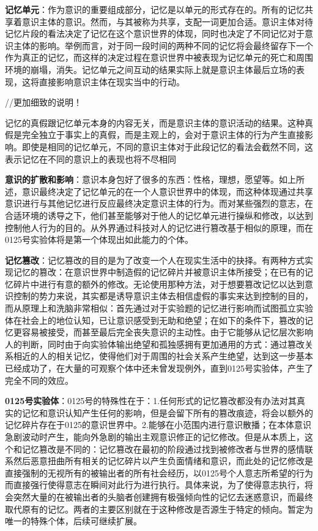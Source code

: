 \documentclass[12pt, a4paper]{article}
\begin{document}
        \medskip
        \textbf{记忆单元}：作为意识的重要组成部分，记忆是以单元的形式存在的。所有的记忆共享着意识主体的意识。然而，与其被称为共享，支配一词更加合适。意识主体对待记忆片段的看法决定了记忆在这个意识世界的体现，同时也决定了不同记忆对于意识主体的影响。举例而言，对于同一段时间的两种不同的记忆将会最终留存下一个作为真正的记忆，而这样的决定过程在意识世界中被表现为记忆单元的死亡和周围环境的崩塌，消失。记忆单元之间互动的结果实际上就是意识主体最后立场的表现，这将直接影响意识主体在现实当中的行动。 

        //更加细致的说明！

        记忆的真假跟记忆单元本身的内容无关，而是意识主体的意识活动的结果。这种真假是完全独立于事实上的真假，而是主观上的，会对于意识主体的行为产生直接影响。即使是相同的记忆单元，不同的意识主体对于此段记忆的看法会截然不同，这表示记忆在不同的意识上的表现也将不尽相同

        \medskip
        \textbf{意识的扩散和影响}：意识本身包好了很多的东西：性格，理想，愿望等。如上所述，意识最终决定了记忆单元的在一个人意识世界中的体现，而这种体现通过共享意识进行与其他记忆进行反应最终决定意识主体的行为。而对某些强烈的意志，在合适环境的诱导之下，他们甚至能够对于他人的记忆单元进行操纵和修改，以达到控制他人行为的目的。从外界通过科技对人的记忆进行篡改基于相似的原理，而在0125号实验体将是第一个体现出如此能力的个体。

        \medskip
        \textbf{记忆篡改}：记忆篡改的目的是为了改变一个人在现实生活中的抉择。有两种方式实现记忆的篡改：在意识世界中制造假的记忆碎片并被意识主体所接受；在已有的记忆碎片中进行有意的额外的修改。无论使用那种方法，对于想要篡改记忆以达到意识控制的势力来说，其实都是诱导意识主体去相信虚假的事实来达到控制的目的，而从原理上和洗脑非常相似：首先通过对于实验题的记忆进行影响而试图孤立实验体在社会上的地位认知，已让意识感受到无助和绝望；在如下的条件下，篡改的记忆更容易被接受，而甚至最后完全丧失意识的主动性。由于它能够从记忆层次影响人的判断，同时由于向实验体输出绝望和孤独感拥有更加通用的方式：通过篡改关系相近的人的相关记忆，使得他们对于周围的社会关系产生绝望，达到这一步基本已经成功了，在大量的可观察个体中还未曾发现例外，直到0125号实验体，产生了完全不同的效应。
        
        \textbf{0125号实验体}：0125号的特殊性在于：1.任何形式的记忆篡改都没有办法对其真实的记忆和意识认知产生任何的影响，但是会留下所有的篡改痕迹，将会以额外的记忆碎片存在于0125的意识世界中。2.能够在小范围内进行意识散播；在本体意识急剧波动时产生，能向外急剧的输出主观意识修正的记忆修改。但是从本质上，这个和记忆篡改是不同的：记忆篡改在最初的阶段通过找到被修改者与世界的感情联系然后恶意扭曲所有相关的记忆碎片以产生负面情绪和意识，而此处的记忆修改是直接强制的无视所有的被输出者的所有社会经历，以0125号个人意志所希望的行为而直接强行使得意志在瞬间对此行为进行执行。具体来说，为了使得意志执行，将会突然大量的在被输出者的头脑者创建拥有极强倾向性的记忆去迷惑意识，而最终取代原有的记忆。两者的主要区别就在于这种修改是否源生于特定的倾向。暂定为唯一的特殊个体，后续可继续扩展。
\end{document}
